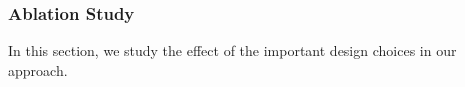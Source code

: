 



\subsubsection{Ablation Study}
\label{sec:ablation}

In this section, we study the effect of the important design choices in our approach.

